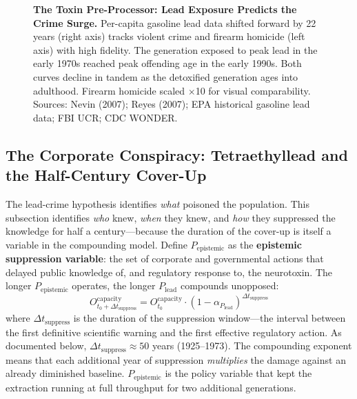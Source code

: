 \begin{figure}[htbp]
\caption{\textbf{The Toxin Pre-Processor: Lead Exposure Predicts the Crime Surge.} Per-capita gasoline lead data shifted forward by 22 years (right axis) tracks violent crime and firearm homicide (left axis) with high fidelity. The generation exposed to peak lead in the early 1970s reached peak offending age in the early 1990s. Both curves decline in tandem as the detoxified generation ages into adulthood. Firearm homicide scaled $\times$10 for visual comparability. Sources: Nevin (2007); Reyes (2007); EPA historical gasoline lead data; FBI UCR; CDC WONDER.}
\label{fig:lead_crime}
\end{figure}

\subsection{The Corporate Conspiracy: Tetraethyllead and the Half-Century Cover-Up}

The lead-crime hypothesis identifies \textit{what} poisoned the population. This subsection identifies \textit{who} knew, \textit{when} they knew, and \textit{how} they suppressed the knowledge for half a century---because the duration of the cover-up is itself a variable in the compounding model. Define $P_{\text{epistemic}}$ as the \textbf{epistemic suppression variable}: the set of corporate and governmental actions that delayed public knowledge of, and regulatory response to, the neurotoxin. The longer $P_{\text{epistemic}}$ operates, the longer $P_{\text{lead}}$ compounds unopposed:
\begin{equation}\label{eq:9.2-epistemic-suppression-variable}
O_{t_0 + \Delta t_{\text{suppress}}}^{\text{capacity}} = O_{t_0}^{\text{capacity}} \cdot (1 - \alpha_{P_{\text{lead}}})^{\Delta t_{\text{suppress}}}
\end{equation}
where $\Delta t_{\text{suppress}}$ is the duration of the suppression window---the interval between the first definitive scientific warning and the first effective regulatory action. As documented below, $\Delta t_{\text{suppress}} \approx 50$ years (1925--1973). The compounding exponent means that each additional year of suppression \textit{multiplies} the damage against an already diminished baseline. $P_{\text{epistemic}}$ is the policy variable that kept the extraction running at full throughput for two additional generations.

